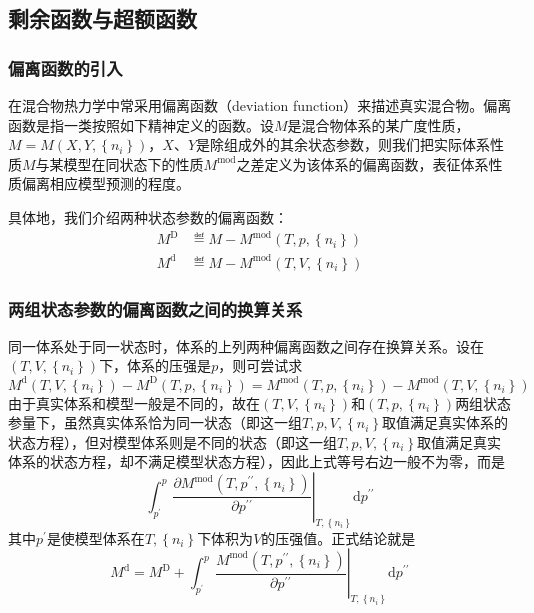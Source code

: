 \documentclass[main.tex]{subfiles}
\begin{document}
\subsection{剩余函数与超额函数}
\subsubsection{偏离函数的引入}
在混合物热力学中常采用偏离函数（deviation function）来描述真实混合物。偏离函数是指一类按照如下精神定义的函数。设$M$是混合物体系的某广度性质，$M=M\left(X,Y,\left\{n_i\right\}\right)$，$X$、$Y$是除组成外的其余状态参数，则我们把实际体系性质$M$与某模型在同状态下的性质$M^\text{mod}$之差定义为该体系的偏离函数，表征体系性质偏离相应模型预测的程度。

具体地，我们介绍两种状态参数的偏离函数：
\begin{align}
    M^\text{D} & \eqdef M-M^\text{mod}\left(T,p,\left\{n_i\right\}\right)\label{eq:II.4_def_deviation_function_D} \\
    M^\text{d} & \eqdef M-M^\text{mod}\left(T,V,\left\{n_i\right\}\right)\label{eq:II.4_def_deviation_function_d}
\end{align}

\subsubsection{两组状态参数的偏离函数之间的换算关系}
同一体系处于同一状态时，体系的上列两种偏离函数之间存在换算关系。设在$\left(T,V,\left\{n_i\right\}\right)$下，体系的压强是$p$，则可尝试求
\[M^\text{d}\left(T,V,\left\{n_i\right\}\right)-M^\text{D}\left(T,p,\left\{n_i\right\}\right)=M^\text{mod}\left(T,p,\left\{n_i\right\}\right)-M^\text{mod}\left(T,V,\left\{n_i\right\}\right)\]
由于真实体系和模型一般是不同的，故在$\left(T,V,\left\{n_i\right\}\right)$和$\left(T,p,\left\{n_i\right\}\right)$两组状态参量下，虽然真实体系恰为同一状态（即这一组$T,p,V,\left\{n_i\right\}$取值满足真实体系的状态方程），但对模型体系则是不同的状态（即这一组$T,p,V,\left\{n_i\right\}$取值满足真实体系的状态方程，却不满足模型状态方程），因此上式等号右边一般不为零，而是
\[\int_{p^\prime}^p\left.\frac{\partial M^\text{mod}\left(T,p^{\prime\prime},\left\{n_i\right\}\right)}{\partial p^{\prime\prime}}\right|_{T,\left\{n_i\right\}}\mathrm{d}p^{\prime\prime}\]
其中$p^\prime$是使模型体系在$T,\left\{n_i\right\}$下体积为$V$的压强值。正式结论就是
\begin{equation}\label{eq:II.4_deviation_function_relation}
    M^\text{d}=M^\text{D}+\int_{p^\prime}^p\left.\frac{M^\text{mod}\left(T,p^{\prime\prime},\left\{n_i\right\}\right)}{\partial p^{\prime\prime}}\right|_{T,\left\{n_i\right\}}\mathrm{d}p^{\prime\prime}
\end{equation}
\end{document}
